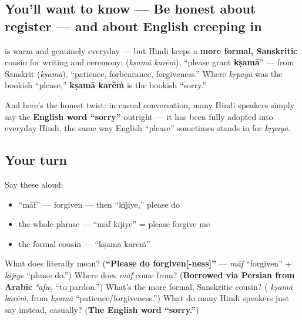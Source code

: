 \subsection*{You'll want to know — Be honest about register — and about English creeping in}
\textbf{ } is warm and genuinely everyday — but Hindi keeps a \textbf{more formal, Sanskritic} cousin for writing and ceremony: \textbf{ } (\emph{kṣamā karēṁ}), \textquotedblleft{}please grant \textbf{kṣamā}\textquotedblright{} — from Sanskrit \textbf{} (\emph{kṣamā}), \textquotedblleft{}patience, forbearance, forgiveness.\textquotedblright{} Where \emph{kṛpayā} was the bookish \textquotedblleft{}please,\textquotedblright{} \textbf{kṣamā karēṁ} is the bookish \textquotedblleft{}sorry.\textquotedblright{}

And here's the honest twist: in casual conversation, many Hindi speakers simply say the \textbf{English word \textquotedblleft{}sorry\textquotedblright{}} outright — it has been fully adopted into everyday Hindi, the same way English \textquotedblleft{}please\textquotedblright{} sometimes stands in for \emph{kṛpayā}.

\subsection*{Your turn}
Say these aloud:

\begin{itemize}
\raggedright
  \item \textquotedblleft{}māf\textquotedblright{} — forgiven — then \textquotedblleft{}kījiye,\textquotedblright{} please do
  \item the whole phrase — \textquotedblleft{}māf kījiye\textquotedblright{} = please forgive me
  \item the formal cousin — \textquotedblleft{}kṣamā karēṁ\textquotedblright{}
\end{itemize}

\begin{tcolorbox}[breakable,colback=teal!4,colframe=teal!35!black,title={Before you move on}]
What does \textbf{ } literally mean? (\textbf{\textquotedblleft{}Please do forgiven{[}-ness{]}\textquotedblright{}} — \emph{māf} \textquotedblleft{}forgiven\textquotedblright{} + \emph{kījiye} \textquotedblleft{}please do.\textquotedblright{}) Where does \emph{māf} come from? (\textbf{Borrowed via Persian from Arabic} \emph{ʿafw}, \textquotedblleft{}to pardon.\textquotedblright{}) What's the more formal, Sanskritic cousin? (\textbf{ } \emph{kṣamā karēṁ}, from \emph{kṣamā} \textquotedblleft{}patience/forgiveness.\textquotedblright{}) What do many Hindi speakers just say instead, casually? (\textbf{The English word \textquotedblleft{}sorry.\textquotedblright{}})
\end{tcolorbox}
